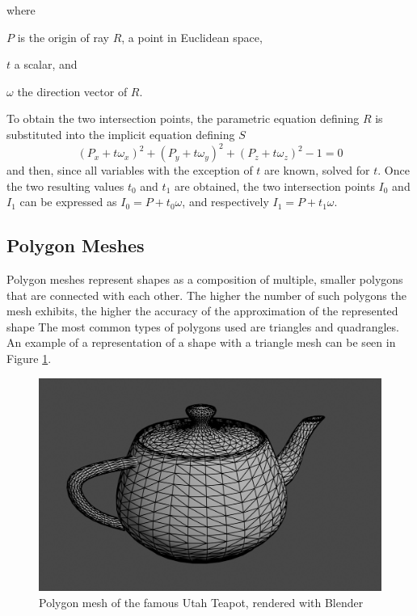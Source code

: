 \noindent where
\begin{description}
	\setlength\itemsep{0.05em}
	\item  $P$ is the origin of ray $R$, a point in Euclidean space,
	\item  $t$ a scalar, and
	\item  $\omega$ the direction vector of $R$.
\end{description}

To obtain the two intersection points, the parametric equation defining $R$ is substituted into the implicit equation defining $S$
\begin{equation}\label{eq:substitution}
(P_{x}+t\omega_{x})^{2}+(P_{y}+t\omega_{y})^{2}+(P_{z}+t\omega_{z})^{2}-1 = 0
\end{equation}
and then, since all variables with the exception of $t$ are known, solved for $t$.
Once the two resulting values $t_{0}$ and $t_{1}$ are obtained, the two intersection points $I_{0}$ and $I_{1}$ can be expressed as $I_{0} = P + t_{0}\omega$, and respectively $I_{1} = P + t_{1}\omega$.

\subsection{Polygon Meshes}

Polygon meshes represent shapes as a composition of multiple, smaller polygons that are connected with each other. The higher the number of such polygons the mesh exhibits, the higher the accuracy of the approximation of the represented shape  The most common types of polygons used are triangles and quadrangles. An example of a representation of a shape with a triangle mesh can be seen in Figure \ref{fig:poly_mesh}. 

\begin{figure}
	\centering
	\includegraphics[width=.8\linewidth]{img/1 fundamentals/poly_mesh.png}
	\caption{Polygon mesh of the famous Utah Teapot, rendered with Blender \cite{blender2018}}
	\label{fig:poly_mesh}
\end{figure}

